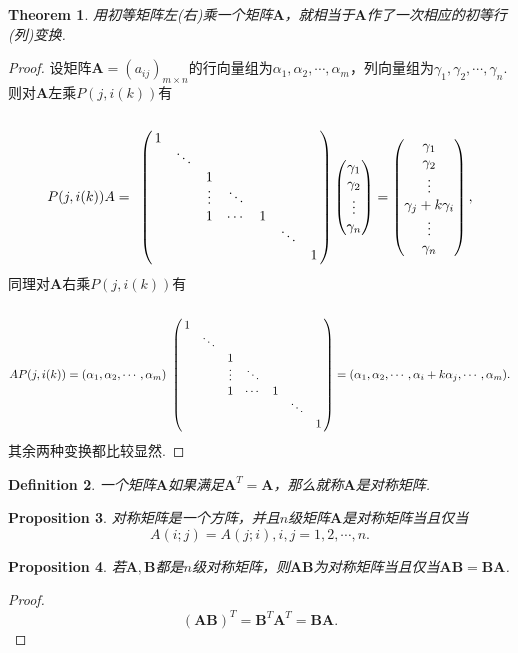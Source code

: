 \documentclass{article}
\newtheorem{theorem}{Theorem}[section]
\newtheorem{proposition}[theorem]{Proposition}
\newtheorem{definition}[theorem]{Definition}
\newcommand{\mbf}[1]{\bm{#1}}
\begin{document}
\begin{theorem}
\rm 用初等矩阵左(右)乘一个矩阵$\mbf{A}$，就相当于$\mbf{A}$作了一次相应的初等行(列)变换.
\end{theorem}

\begin{proof}
设矩阵$\mbf{A}=(a_{ij})_{m\times n}$的行向量组为$\alpha_1,\alpha_2,\cdots,\alpha_m$，列向量组为$\gamma_1,\gamma_2,\cdots,\gamma_n$. 则对$\mbf{A}$左乘$P(j,i(k))$有
$$
P(j,i(k))A = \bordermatrix{
		&\cr
		& 1 \cr
		& &\ddots	\cr
		& & & 1 \cr
		& & & \vdots & \ddots	\cr
		& & &  1& \cdots & 1	\cr
		& & & & & & \ddots	\cr
		& & & & & & & 1	\cr
		} \begin{pmatrix}\gamma_1 \\ \gamma_2 \\ \vdots \\ \gamma_n \end{pmatrix} = \begin{pmatrix}\gamma_1 \\ \gamma_2 \\ \vdots\\ \gamma_j + k\gamma_i \\ \vdots \\ \gamma_n \end{pmatrix},
$$
同理对$\mbf{A}$右乘$P(j,i(k))$有
$$
AP(j,i(k)) = (\alpha_1,\alpha_2,\cdots,\alpha_m) \bordermatrix{
		&\cr
		& 1 \cr
		& &\ddots	\cr
		& & & 1 \cr
		& & & \vdots & \ddots	\cr
		& & &  1& \cdots & 1	\cr
		& & & & & & \ddots	\cr
		& & & & & & & 1	\cr
		} = (\alpha_1,\alpha_2,\cdots,\alpha_{i} + k\alpha_{j},\cdots,\alpha_m).
$$
其余两种变换都比较显然.
\end{proof}

\begin{definition}
\rm 一个矩阵$\mbf{A}$如果满足$\mbf{A}^T = \mbf{A}$，那么就称$\mbf{A}$是对称矩阵. 
\end{definition}

\begin{proposition}
\rm 对称矩阵是一个方阵，并且$n$级矩阵$\mbf{A}$是对称矩阵当且仅当
$$
A(i;j) = A(j;i), i,j = 1,2,\cdots,n.
$$
\end{proposition}

\begin{proposition}
\rm 若$\mbf{A},\mbf{B}$都是$n$级对称矩阵，则$\mbf{A}\mbf{B}$为对称矩阵当且仅当$\mbf{A}\mbf{B} = \mbf{B}\mbf{A}$.
\end{proposition}

\begin{proof}
$$
(\mbf{A}\mbf{B})^T = \mbf{B}^T\mbf{A}^T = \mbf{B}\mbf{A}.
$$
\end{proof}
\end{document}
